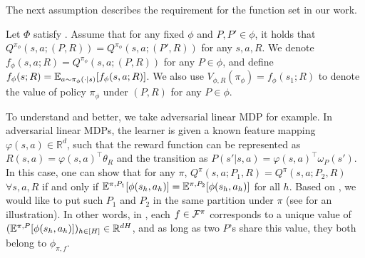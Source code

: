 The next assumption describes the requirement for the function set in our work. 
\begin{assumption}\label{assum: unique mapping}
    Let $\Phi$ satisfy . Assume that for any fixed $\phi$ and $P, P'\in \phi$, it holds that $Q^{\pi_\phi}(s,a; (P, R)) = Q^{\pi_\phi}(s,a; (P', R))$ for any $s, a, R$. We denote $f_\phi(s,a; R) = Q^{\pi_\phi}(s,a; (P, R))$ for any $P\in\phi$, and define $f_\phi(s; R) = \mathbb{E}_{a\sim \pi_\phi(\cdot|s)}[f_\phi(s,a; R)]$. We also use $V_{\phi, R}(\pi_\phi) = f_\phi(s_1; R)$ to denote the value of policy $\pi_\phi$ under $(P, R)$ for any $P\in \phi$.  
    
    
\end{assumption}

To understand  and  better, we take adversarial linear MDP \cite{liu2023towards} for example. In adversarial linear MDPs, the learner is given a known feature mapping $\varphi(s,a)\in\mathbb{R}^d$, such that the reward function can be represented as $R(s,a)=\varphi(s,a)^\top \theta_R$ and the transition as $P(s'|s,a) = \varphi(s,a)^\top \omega_P(s')$. In this case, one can show that for any $\pi$, $Q^\pi(s,a; P_1,R) = Q^\pi(s,a; P_2,R)$ $\forall s,a,R$ if and only if $\mathbb{E}^{\pi,P_1}[\phi(s_h,a_h)] = \mathbb{E}^{\pi,P_2}[\phi(s_h,a_h)]$ for all $h$. Based on , we would like to put such $P_1$ and $P_2$ in the same partition under $\pi$ (see  for an illustration).   In other words, in , each $f\in\mathcal{F}^\pi$ corresponds to a unique value of $(\mathbb{E}^{\pi,P}[\phi(s_h,a_h)])_{h\in[H]}\in\mathbb{R}^{dH}$, and as long as two $P$'s share this value, they both belong to $\phi_{\pi,f}$.    

